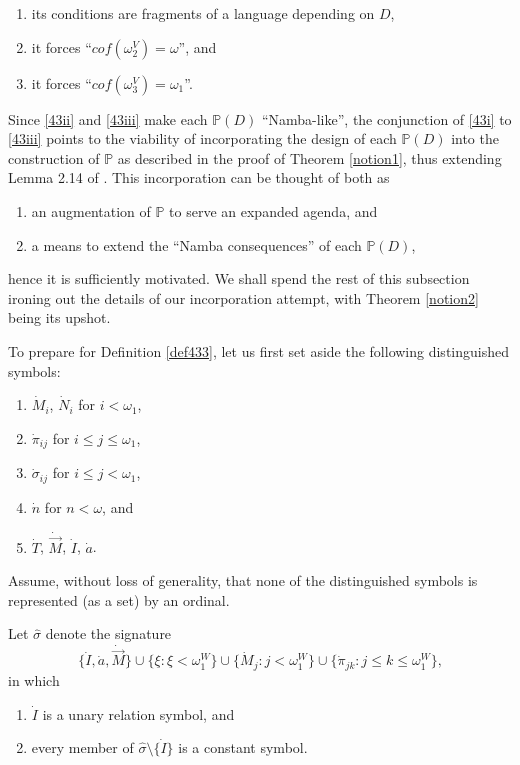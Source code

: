 \documentclass[12pt]{article}
\numberwithin{equation}{section}
\begin{document}
\begin{enumerate}[label=(\roman*)]
    \item\label{43i} its conditions are fragments of a language depending on $D$,
    \item\label{43ii} it forces ``$cof(\omega_2^V) = \omega$'', and
    \item\label{43iii} it forces ``$cof(\omega_3^V) = \omega_1$''.
\end{enumerate}
Since \ref{43ii} and \ref{43iii} make each $\mathbb{P}(D)$ ``Namba-like'', the conjunction of \ref{43i} to \ref{43iii} points to the viability of incorporating the design of each $\mathbb{P}(D)$ into the construction of $\mathbb{P}$ as described in the proof of Theorem \ref{notion1}, thus extending Lemma 2.14 of \cite{schindler}. This incorporation can be thought of both as
\begin{enumerate}[label=(\Alph*)]
    \item an augmentation of $\mathbb{P}$ to serve an expanded agenda, and
    \item a means to extend the ``Namba consequences'' of each $\mathbb{P}(D)$,
\end{enumerate}
hence it is sufficiently motivated. We shall spend the rest of this subsection ironing out the details of our incorporation attempt, with Theorem \ref{notion2} being its upshot.

\begin{defi}\label{defl2}
To prepare for Definition \ref{def433}, let us first set aside the following distinguished symbols:
\begin{enumerate}[label=(\alph*)]
    \item $\dot{M}_i$, $\dot{N}_i$ for $i < \omega_1$,
    \item $\dot{\pi}_{ij}$ for $i \leq j \leq \omega_1$,
    \item $\dot{\sigma}_{ij}$ for $i \leq j < \omega_1$,
    \item $\dot{n}$ for $n < \omega$, and
    \item $\dot{T}$, $\dot{\Vec{M}}$, $\dot{I}$, $\dot{a}$.
\end{enumerate}
Assume, without loss of generality, that none of the distinguished symbols is represented (as a set) by an ordinal.
\end{defi}

\begin{defi}
Let $\hat{\sigma}$ denote the signature
\begin{equation*}
    \{\dot{I}, \dot{a}, \dot{\Vec{M}}\} \cup \{\xi : \xi < \omega_1^W\} \cup \{\dot{M}_j : j < \omega_1^W\} \cup \{\dot{\pi}_{jk} : j \leq k \leq \omega_1^W\} \text{,}
\end{equation*}
in which
\begin{enumerate}[label=(\alph*)]
    \item $\dot{I}$ is a unary relation symbol, and
    \item every member of $\hat{\sigma} \setminus \{\dot{I}\}$ is a constant symbol.
\end{enumerate}
\end{defi}
\end{document}
